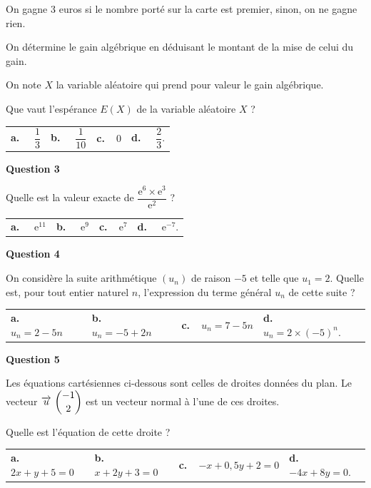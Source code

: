 \documentclass[10pt]{article}
\providecommand{\vv}[1]{\overrightarrow{#1}}
\providecommand{\e}{{\mathrm{e}}}
\providecommand{\vv}[1]{{\overrightarrow{#1}}}
\begin{document}
On gagne 3 euros si le nombre porté sur la carte est premier, sinon, on ne gagne rien.

On détermine le gain algébrique en déduisant le montant de la mise de celui du gain.

On note $X$ la variable aléatoire qui prend pour valeur le gain algébrique.

Que vaut l'espérance $E(X)$ de la variable aléatoire $X$ ?

\medskip

\begin{tabularx}{\linewidth}{*{4}{X}}
\textbf{a.~~} $\dfrac{1}{3} $ &\textbf{b.~~} $\dfrac{1}{10} $&\textbf{c.~~}$ 0$& \textbf{d.~~} $\dfrac{2}{3}$.
\end{tabularx}

\medskip

\textbf{Question 3}

\medskip

Quelle est la valeur exacte de $\dfrac{\e^6\times\e^3}{\e^2}$ ?

\medskip

\begin{tabularx}{\linewidth}{*{4}{X}}
\textbf{a.~~} $\e^{11}$ &\textbf{b.~~} $\e^{9}  $&\textbf{c.~~}$\e^{7} $& \textbf{d.~~} $ \e^{-7} $.
\end{tabularx}

\medskip

\textbf{Question 4}

\medskip 

On considère la suite arithmétique $\left(u_n\right)$ de raison $-5$ et telle que $u_1 = 2$. Quelle est, pour tout entier naturel $n$, l'expression du terme général $u_n$ de cette suite ?

\medskip

\begin{tabularx}{\linewidth}{*{4}{X}}
\textbf{a.~~} $u_n = 2- 5n $ &\textbf{b.~~} $u_n = -5 + 2n  $&\textbf{c.~~}$ u_n = 7 - 5n  $& \textbf{d.~~} $u_n = 2 \times(-5)^n $.
\end{tabularx}

\medskip

\textbf{Question 5}

\medskip 

Les équations cartésiennes ci-dessous sont celles de droites données du plan. Le vecteur
$\vv{u}\ \dbinom{-1}{2}$  est un vecteur normal à l'une de ces droites.

Quelle est l'équation de cette droite ?

\medskip

\begin{tabularx}{\linewidth}{*{4}{X}}
\textbf{a.~~} $2x + y+ 5 = 0 $ &\textbf{b.~~} $x + 2y + 3 = 0  $&\textbf{c.~~}$ -x + 0,5y+ 2 = 0$& \textbf{d.~~} $ -4x + 8y = 0 $.
\end{tabularx}

\vspace{0,5cm}
\end{document}
